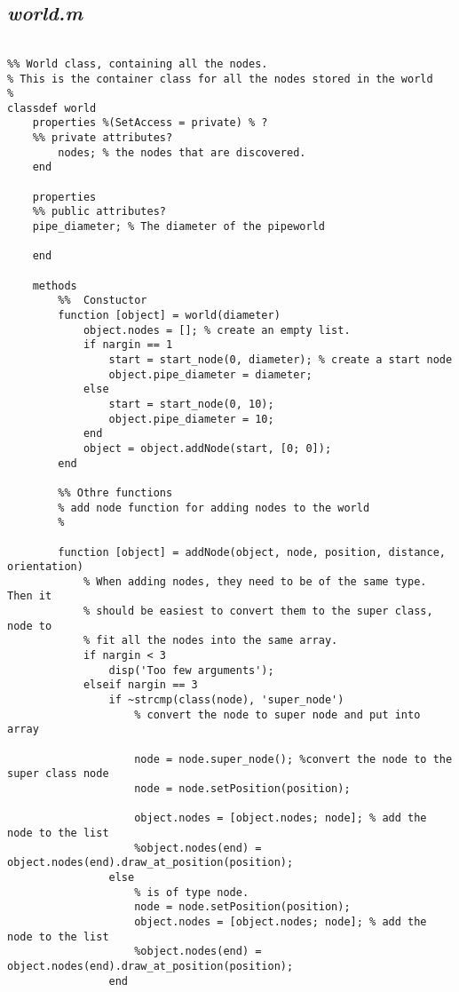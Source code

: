 \subsection{\emph{world.m}}
\begin{lstlisting}

%% World class, containing all the nodes. 
% This is the container class for all the nodes stored in the world
% 
classdef world
    properties %(SetAccess = private) % ?
    %% private attributes?
        nodes; % the nodes that are discovered. 
    end
    
    properties
    %% public attributes?
    pipe_diameter; % The diameter of the pipeworld
    
    end
    
    methods
        %%  Constuctor
        function [object] = world(diameter)
            object.nodes = []; % create an empty list.
            if nargin == 1
                start = start_node(0, diameter); % create a start node
                object.pipe_diameter = diameter;
            else
                start = start_node(0, 10);
                object.pipe_diameter = 10;
            end
            object = object.addNode(start, [0; 0]);
        end
        
        %% Othre functions
        % add node function for adding nodes to the world
        % 
        
        function [object] = addNode(object, node, position, distance, orientation)        
            % When adding nodes, they need to be of the same type. Then it
            % should be easiest to convert them to the super class, node to
            % fit all the nodes into the same array.
            if nargin < 3
                disp('Too few arguments');
            elseif nargin == 3
                if ~strcmp(class(node), 'super_node')
                    % convert the node to super node and put into array
                    
                    node = node.super_node(); %convert the node to the super class node
                    node = node.setPosition(position);
                    
                    object.nodes = [object.nodes; node]; % add the node to the list
                    %object.nodes(end) = object.nodes(end).draw_at_position(position);
                else
                    % is of type node.
                    node = node.setPosition(position);
                    object.nodes = [object.nodes; node]; % add the node to the list
                    %object.nodes(end) = object.nodes(end).draw_at_position(position);
                end
                

\end{lstlisting}
